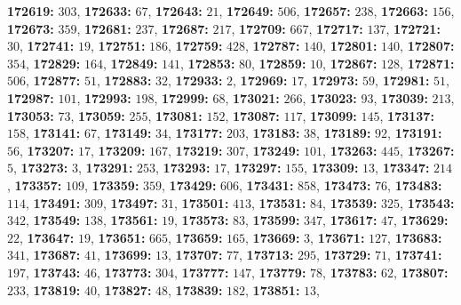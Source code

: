 \textsf{\bfseries 172619:} $303$, \textsf{\bfseries 172633:} $67$, \textsf{\bfseries 172643:} $21$, \textsf{\bfseries 172649:} $506$, \textsf{\bfseries 172657:} $238$, \textsf{\bfseries 172663:} $156$, \textsf{\bfseries 172673:} $359$, \textsf{\bfseries 172681:} $237$, \textsf{\bfseries 172687:} $217$, \textsf{\bfseries 172709:} $667$, \textsf{\bfseries 172717:} $137$, \textsf{\bfseries 172721:} $30$, \textsf{\bfseries 172741:} $19$, \textsf{\bfseries 172751:} $186$, \textsf{\bfseries 172759:} $428$, \textsf{\bfseries 172787:} $140$, \textsf{\bfseries 172801:} $140$, \textsf{\bfseries 172807:} $354$, \textsf{\bfseries 172829:} $164$, \textsf{\bfseries 172849:} $141$, \textsf{\bfseries 172853:} $80$, \textsf{\bfseries 172859:} $10$, \textsf{\bfseries 172867:} $128$, \textsf{\bfseries 172871:} $506$, \textsf{\bfseries 172877:} $51$, \textsf{\bfseries 172883:} $32$, \textsf{\bfseries 172933:} $2$, \textsf{\bfseries 172969:} $17$, \textsf{\bfseries 172973:} $59$, \textsf{\bfseries 172981:} $51$, \textsf{\bfseries 172987:} $101$, \textsf{\bfseries 172993:} $198$, \textsf{\bfseries 172999:} $68$, \textsf{\bfseries 173021:} $266$, \textsf{\bfseries 173023:} $93$, \textsf{\bfseries 173039:} $213$, \textsf{\bfseries 173053:} $73$, \textsf{\bfseries 173059:} $255$, \textsf{\bfseries 173081:} $152$, \textsf{\bfseries 173087:} $117$, \textsf{\bfseries 173099:} $145$, \textsf{\bfseries 173137:} $158$, \textsf{\bfseries 173141:} $67$, \textsf{\bfseries 173149:} $34$, \textsf{\bfseries 173177:} $203$, \textsf{\bfseries 173183:} $38$, \textsf{\bfseries 173189:} $92$, \textsf{\bfseries 173191:} $56$, \textsf{\bfseries 173207:} $17$, \textsf{\bfseries 173209:} $167$, \textsf{\bfseries 173219:} $307$, \textsf{\bfseries 173249:} $101$, \textsf{\bfseries 173263:} $445$, \textsf{\bfseries 173267:} $5$, \textsf{\bfseries 173273:} $3$, \textsf{\bfseries 173291:} $253$, \textsf{\bfseries 173293:} $17$, \textsf{\bfseries 173297:} $155$, \textsf{\bfseries 173309:} $13$, \textsf{\bfseries 173347:} $214$, \textsf{\bfseries 173357:} $109$, \textsf{\bfseries 173359:} $359$, \textsf{\bfseries 173429:} $606$, \textsf{\bfseries 173431:} $858$, \textsf{\bfseries 173473:} $76$, \textsf{\bfseries 173483:} $114$, \textsf{\bfseries 173491:} $309$, \textsf{\bfseries 173497:} $31$, \textsf{\bfseries 173501:} $413$, \textsf{\bfseries 173531:} $84$, \textsf{\bfseries 173539:} $325$, \textsf{\bfseries 173543:} $342$, \textsf{\bfseries 173549:} $138$, \textsf{\bfseries 173561:} $19$, \textsf{\bfseries 173573:} $83$, \textsf{\bfseries 173599:} $347$, \textsf{\bfseries 173617:} $47$, \textsf{\bfseries 173629:} $22$, \textsf{\bfseries 173647:} $19$, \textsf{\bfseries 173651:} $665$, \textsf{\bfseries 173659:} $165$, \textsf{\bfseries 173669:} $3$, \textsf{\bfseries 173671:} $127$, \textsf{\bfseries 173683:} $341$, \textsf{\bfseries 173687:} $41$, \textsf{\bfseries 173699:} $13$, \textsf{\bfseries 173707:} $77$, \textsf{\bfseries 173713:} $295$, \textsf{\bfseries 173729:} $71$, \textsf{\bfseries 173741:} $197$, \textsf{\bfseries 173743:} $46$, \textsf{\bfseries 173773:} $304$, \textsf{\bfseries 173777:} $147$, \textsf{\bfseries 173779:} $78$, \textsf{\bfseries 173783:} $62$, \textsf{\bfseries 173807:} $233$, \textsf{\bfseries 173819:} $40$, \textsf{\bfseries 173827:} $48$, \textsf{\bfseries 173839:} $182$, \textsf{\bfseries 173851:} $13$, 
